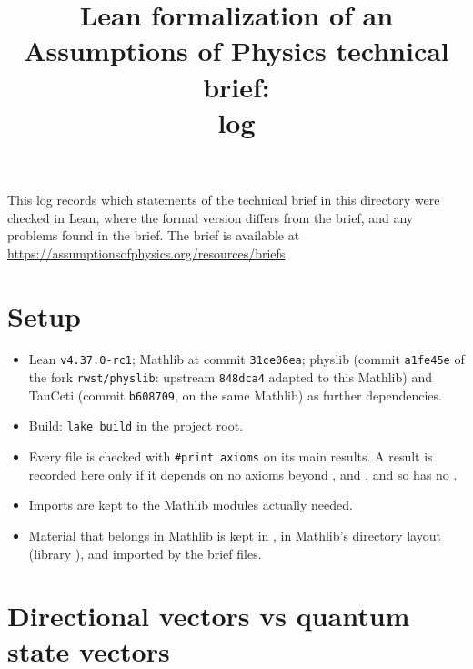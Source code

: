 \documentclass[11pt]{article}
\title{Lean formalization of an Assumptions of Physics technical brief:\\ log}
\author{}
\date{}
\begin{document}
\maketitle

\noindent
This log records which statements of the technical brief in this directory were checked in Lean,
where the formal version differs from the brief, and any problems found in the brief.
The brief is available at \url{https://assumptionsofphysics.org/resources/briefs}.

\section*{Setup}

\begin{itemize}
\item Lean \texttt{v4.37.0-rc1}; Mathlib at commit \texttt{31ce06ea}; physlib (commit \texttt{a1fe45e}
  of the fork \texttt{rwst/physlib}: upstream \texttt{848dca4} adapted to this Mathlib) and
  TauCeti (commit \texttt{b608709}, on the same Mathlib) as further dependencies.
\item Build: \texttt{lake build} in the project root.
\item Every file is checked with \texttt{\#print axioms} on its main results. A result is
  recorded here only if it depends on no axioms beyond ,
   and , and so has no .
\item Imports are kept to the Mathlib modules actually needed.
\item Material that belongs in Mathlib is kept in , in Mathlib's directory
  layout (library ), and imported by the brief files.
\end{itemize}



\section{Directional vectors vs quantum state vectors}
\end{document}
